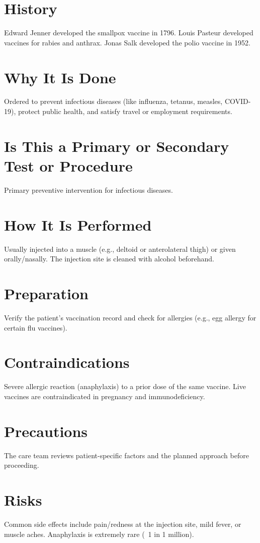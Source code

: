 \section*{History}
Edward Jenner developed the smallpox vaccine in 1796. Louis Pasteur developed vaccines for rabies and anthrax. Jonas Salk developed the polio vaccine in 1952.

\section*{Why It Is Done}
Ordered to prevent infectious diseases (like influenza, tetanus, measles, COVID-19), protect public health, and satisfy travel or employment requirements.

\section*{Is This a Primary or Secondary Test or Procedure}
Primary preventive intervention for infectious diseases.

\section*{How It Is Performed}
Usually injected into a muscle (e.g., deltoid or anterolateral thigh) or given orally/nasally. The injection site is cleaned with alcohol beforehand.

\section*{Preparation}
Verify the patient's vaccination record and check for allergies (e.g., egg allergy for certain flu vaccines).

\section*{Contraindications}
Severe allergic reaction (anaphylaxis) to a prior dose of the same vaccine. Live vaccines are contraindicated in pregnancy and immunodeficiency.

\section*{Precautions}
The care team reviews patient-specific factors and the planned approach before proceeding.

\section*{Risks}
Common side effects include pain/redness at the injection site, mild fever, or muscle aches. Anaphylaxis is extremely rare (~1 in 1 million).

